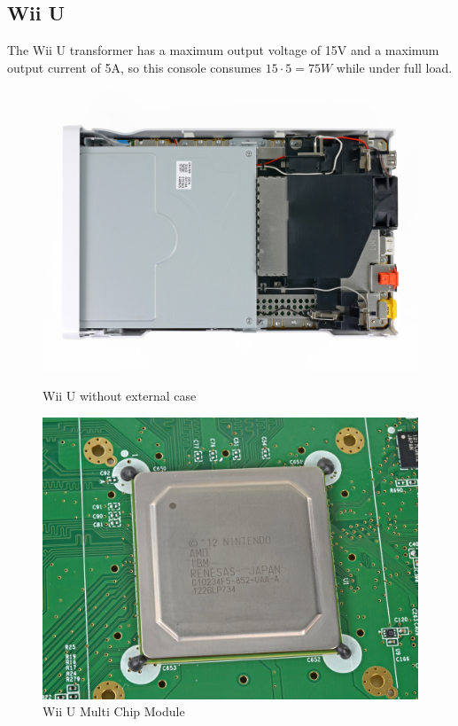 \documentclass[11pt,a4paper,titlepage]{article}
\begin{document}
					\subsection{Wii U}
						The Wii U transformer has a maximum output voltage of 15V and a maximum output current of 5A, so this console consumes $15\cdot 5 = 75W$ while under full load.
						\begin{figure}[ht]
							\centering
							\begin{minipage}{0.45\textwidth}
								\centering
								\includegraphics[width=\textwidth]{external_view.jpeg}
								\caption{Wii U without external case}
								\label{fig:external}
							\end{minipage}
							\begin{minipage}{0.45\textwidth}
								\centering
								\includegraphics[width=\textwidth]{CPU_&_GPU.png}
								\caption{Wii U Multi Chip Module}
								\label{fig:mcm}
							\end{minipage}
						\end{figure}
\end{document}

